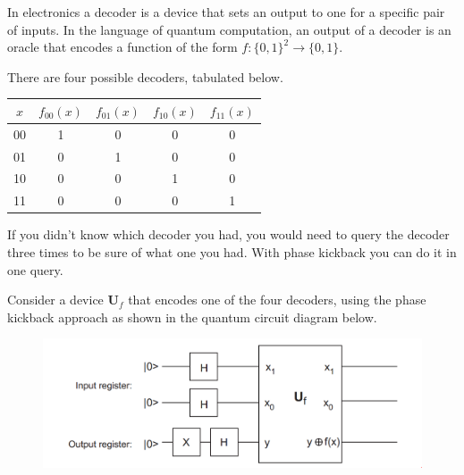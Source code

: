 \documentclass{book}
\theoremstyle{definition}
\newcommand{\U}{\mathbf{U}}
\begin{document}
In electronics a decoder is a device that sets an output to one for a specific pair of inputs. In the language of quantum computation, an output of a decoder is an oracle that encodes a function of the form $f : \{0, 1\}^2 \to \{0, 1\}$. 

There are four possible decoders, tabulated below.
\begin{center}
	\begin{tabular}{|c|c|c|c|c|}
		\hline
		$x$ & $f_{00}(x)$ & $f_{01}(x)$ & $f_{10}(x)$ & $f_{11}(x)$  \\
		\hline
		00 & 1 & 0 & 0 & 0\\
		\hline
		01 & 0 & 1 & 0 & 0 \\
		\hline 
		10 & 0& 0 & 1 & 0 \\
		\hline 
		11 & 0 & 0 & 0 & 1\\
		\hline
	\end{tabular}
\end{center}

If you didn't know which decoder you had, you would need to query the decoder three times to be sure of what one you had. With phase kickback you can do it in one query.

Consider a device $\U_f$ that encodes one of the four decoders, using the phase kickback approach as shown in the quantum circuit diagram below.

\begin{figure}[!htb]
	\centering
	\includegraphics[scale=0.4]{phase2}
\end{figure}
\end{document}
